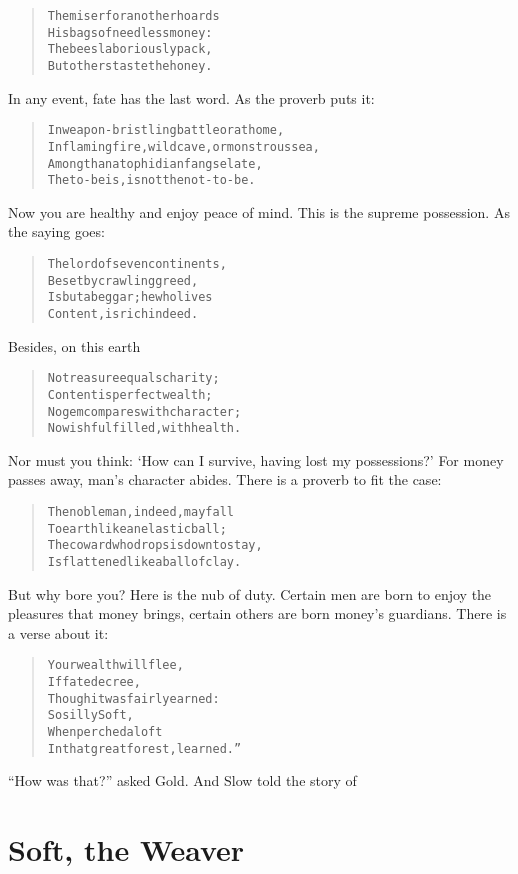 \documentclass[article, twoside, 14pt]{memoir}
\renewenvironment{verbatim}{%
\begin{quote}%
\vskip -10pt%
\begin{alltt}\normalfont\large}{\end{alltt}%
\end{quote}%
\vskip -10pt
} %
\begin{document}
\begin{verbatim}
The miser for another hoards
    His bags of needless money:
The bees laboriously pack,
    But others taste the honey.
\end{verbatim}
In any event, fate has the last word. As the proverb puts it:

\begin{verbatim}
In weapon-bristling battle or at home,
    In flaming fire, wild cave, or monstrous sea,
Among thanatophidian fangs elate,
    The to-be is, is not the not-to-be.
\end{verbatim}
Now you are healthy and enjoy peace of mind. This is the supreme
possession. As the saying goes:

\begin{verbatim}
The lord of seven continents,
    Beset by crawling greed,
Is but a beggar; he who lives
    Content, is rich indeed.
\end{verbatim}
Besides, on this earth

\begin{verbatim}
No treasure equals charity;
    Content is perfect wealth;
No gem compares with character;
    No wish fulfilled, with health.
\end{verbatim}
Nor must you think:
`How can I survive, having lost my possessions?' For money passes
away, man's character abides. There is a proverb to fit the case:

\begin{verbatim}
The noble man, indeed, may fall
To earth{\textemdash}like an elastic ball;
The coward who drops is down to stay,
Is flattened like a ball of clay.
\end{verbatim}
But why bore you? Here is the nub of duty. Certain men are born to
enjoy the pleasures that money brings, certain others are born
money's guardians. There is a verse about it:

\begin{verbatim}
Your wealth will flee,
If fate decree,
Though it was fairly earned:
    So silly Soft,
    When perched aloft
In that great forest, learned.”
\end{verbatim}
``How was that?'' asked Gold. And Slow told the story of

\chapter{Soft, the Weaver}

\label{s42}
\end{document}
